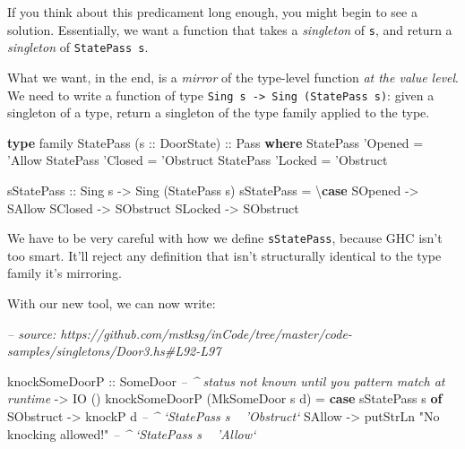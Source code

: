 \documentclass[]{article}
\newenvironment{Shaded}{}{}
\newcommand{\CommentTok}[1]{\textcolor[rgb]{0.38,0.63,0.69}{\textit{#1}}}
\newcommand{\DataTypeTok}[1]{\textcolor[rgb]{0.56,0.13,0.00}{#1}}
\newcommand{\FunctionTok}[1]{\textcolor[rgb]{0.02,0.16,0.49}{#1}}
\newcommand{\KeywordTok}[1]{\textcolor[rgb]{0.00,0.44,0.13}{\textbf{#1}}}
\newcommand{\NormalTok}[1]{#1}
\newcommand{\OtherTok}[1]{\textcolor[rgb]{0.00,0.44,0.13}{#1}}
\newcommand{\StringTok}[1]{\textcolor[rgb]{0.25,0.44,0.63}{#1}}
\begin{document}
If you think about this predicament long enough, you might begin to see a
solution. Essentially, we want a function that takes a \emph{singleton} of
\texttt{s}, and return a \emph{singleton} of \texttt{StatePass\ s}.

What we want, in the end, is a \emph{mirror} of the type-level function \emph{at
the value level}. We need to write a function of type
\texttt{Sing\ s\ -\textgreater{}\ Sing\ (StatePass\ s)}: given a singleton of a
type, return a singleton of the type family applied to the type.

\begin{Shaded}
\begin{Highlighting}[]
\KeywordTok{type}\NormalTok{ family }\DataTypeTok{StatePass}\NormalTok{ (}\OtherTok{s ::} \DataTypeTok{DoorState}\NormalTok{)}\OtherTok{ ::} \DataTypeTok{Pass} \KeywordTok{where}
    \DataTypeTok{StatePass}\NormalTok{ '}\DataTypeTok{Opened} \FunctionTok{=}\NormalTok{ '}\DataTypeTok{Allow}
    \DataTypeTok{StatePass}\NormalTok{ '}\DataTypeTok{Closed} \FunctionTok{=}\NormalTok{ '}\DataTypeTok{Obstruct}
    \DataTypeTok{StatePass}\NormalTok{ '}\DataTypeTok{Locked} \FunctionTok{=}\NormalTok{ '}\DataTypeTok{Obstruct}

\OtherTok{sStatePass ::} \DataTypeTok{Sing}\NormalTok{ s }\OtherTok{->} \DataTypeTok{Sing}\NormalTok{ (}\DataTypeTok{StatePass}\NormalTok{ s)}
\NormalTok{sStatePass }\FunctionTok{=}\NormalTok{ \textbackslash{}}\KeywordTok{case}
    \DataTypeTok{SOpened} \OtherTok{->} \DataTypeTok{SAllow}
    \DataTypeTok{SClosed} \OtherTok{->} \DataTypeTok{SObstruct}
    \DataTypeTok{SLocked} \OtherTok{->} \DataTypeTok{SObstruct}
\end{Highlighting}
\end{Shaded}

We have to be very careful with how we define \texttt{sStatePass}, because GHC
isn't too smart. It'll reject any definition that isn't structurally identical
to the type family it's mirroring.

With our new tool, we can now write:

\begin{Shaded}
\begin{Highlighting}[]
\CommentTok{-- source: https://github.com/mstksg/inCode/tree/master/code-samples/singletons/Door3.hs#L92-L97}

\NormalTok{knockSomeDoorP}
\OtherTok{    ::} \DataTypeTok{SomeDoor}     \CommentTok{-- ^ status not known until you pattern match at runtime}
    \OtherTok{->} \DataTypeTok{IO}\NormalTok{ ()}
\NormalTok{knockSomeDoorP (}\DataTypeTok{MkSomeDoor}\NormalTok{ s d) }\FunctionTok{=} \KeywordTok{case}\NormalTok{ sStatePass s }\KeywordTok{of}
    \DataTypeTok{SObstruct} \OtherTok{->}\NormalTok{ knockP d                        }\CommentTok{-- ^ `StatePass s ~ 'Obstruct`}
    \DataTypeTok{SAllow}    \OtherTok{->}\NormalTok{ putStrLn }\StringTok{"No knocking allowed!"} \CommentTok{-- ^ `StatePass s ~ 'Allow`}
\end{Highlighting}
\end{Shaded}
\end{document}
